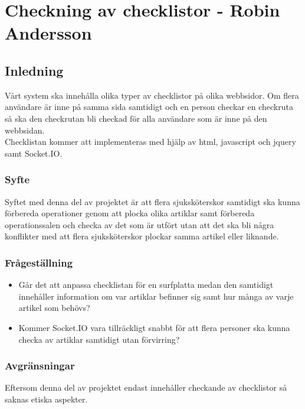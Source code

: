 \section{Checkning av checklistor - Robin Andersson}
\subsection{Inledning}
Vårt system ska innehålla olika typer av checklistor på olika webbsidor. Om flera användare är inne på samma sida samtidigt och en person checkar en checkruta så ska den checkrutan bli checkad för alla användare som är inne på den webbsidan.\\

Checklistan kommer att implementeras med hjälp av html, javascript och jquery samt Socket.IO.

\subsubsection{Syfte}
Syftet med denna del av projektet är att flera sjuksköterskor samtidigt ska kunna förbereda operationer genom att plocka olika artiklar samt förbereda operationssalen och checka av det som är utfört utan att det ska bli några konflikter med att flera sjuksköterskor plockar samma artikel eller liknande.

\subsubsection{Frågeställning}
\begin{itemize}
\item Går det att anpassa checklistan för en surfplatta medan den samtidigt innehåller information om var artiklar befinner sig samt hur många av varje artikel som behövs?
\item Kommer Socket.IO vara tillräckligt snabbt för att flera personer ska kunna checka av artiklar samtidigt utan förvirring?
\end{itemize}

\subsubsection{Avgränsningar}
Eftersom denna del av projektet endast innehåller checkande av checklistor så saknas etiska aspekter.

